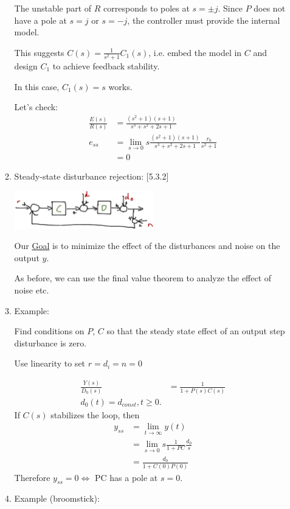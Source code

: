 \begin{enumerate}
\begin{enumerate}
                    The unstable part of $R$ corresponds to poles at $s = \pm j$. Since $P$ does not have a pole at $s = j$ or $s = -j$, the controller must provide the internal model.

                    This suggests $C(s) = \frac{1}{s^2 + 1} C_1(s)$, i.e. embed the model in $C$ and design $C_1$ to achieve feedback stability.

                    In this case, $C_1(s) = s$ works.

                    Let's check:
                    \begin{align*}
                        \frac{E(s)}{R(s)} &= \frac{(s^2 + 1)(s+1)}{s^3 + s^2 + 2s + 1} \\
                        e_{ss} &= \lim_{s\to 0} s \frac{(s^2 + 1)(s+1)}{s^3 + s^2 + 2s + 1} \frac{r_0}{s^2 + 1} \\
                        &= 0
                    \end{align*}
                \item Steady-state disturbance rejection: [5.3.2]

                    \begin{center}\includegraphics[width=0.5\textwidth,keepaspectratio]{images/5-12-a.png}\end{center}

                    Our \uline{Goal} is to minimize the effect of the disturbances and noise on the output $y$.

                    As before, we can use the final value theorem to analyze the effect of noise etc.

                \item Example:

                    Find conditions on $P$, $C$ so that the steady state effect of an output step disturbance is zero.

                    Use linearity to set $r = d_i = n = 0$

                    \begin{align*}
                        \frac{Y(s)}{D_0(s)} &= \frac{1}{1 + P(s)C(s)} \\
                        d_0(t) = d_{const}, t \ge 0.
                    \end{align*}
                    If $C(s)$ stabilizes the loop, then
                    \begin{align*}
                        y_{ss} &= \lim_{t\to \infty}y(t) \\
                        &= \lim_{s \to 0} s \frac{1}{1+PC} \frac{d_0}{s} \\
                        &= \frac{d_0}{1 + C(0)P(0)}
                    \end{align*}
                    Therefore $y_{ss} = 0 \Leftrightarrow $ PC has a pole at $s = 0$.
                \item Example (broomstick):


\end{enumerate}
\end{enumerate}
